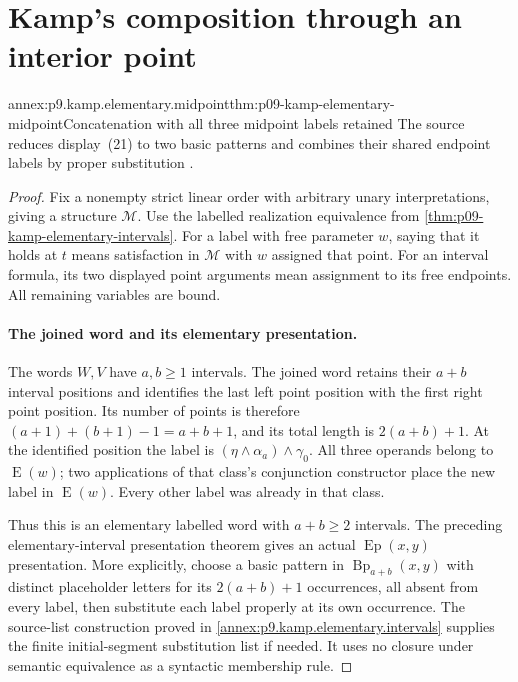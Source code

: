 
\section{Kamp's composition through an interior point}
\label{sec:annex-p09-kamp-iii2-lemma5}

\begin{annexitem}{annex:p9.kamp.elementary.midpoint}{thm:p09-kamp-elementary-midpoint}{Concatenation with all three midpoint labels retained}
The source reduces display~(21) to two basic patterns and combines their
shared endpoint labels by proper substitution
\cite[ch.~III, p.~79]{Kamp1968}.

\begin{proof}
Fix a nonempty strict linear order with arbitrary unary interpretations,
giving a structure \(\mathcal M\). Use the labelled realization
equivalence from \cref{thm:p09-kamp-elementary-intervals}.
For a label with free parameter \(w\), saying that it holds at \(t\)
means satisfaction in \(\mathcal M\) with \(w\) assigned that point.
For an interval formula, its two displayed point arguments mean
assignment to its free endpoints. All remaining variables are bound.

\paragraph{The joined word and its elementary presentation.}
The words \(W,V\) have \(a,b\geq1\) intervals. The joined word
retains their \(a+b\) interval positions and identifies the last left
point position with the first right point position. Its number of
points is therefore \((a+1)+(b+1)-1=a+b+1\), and its total length
is \(2(a+b)+1\). At the identified position the label is
\((\eta\land\alpha_a)\land\gamma_0\). All three operands belong to
\(\operatorname{E}(w)\); two applications of that class's conjunction
constructor place the new label in \(\operatorname{E}(w)\).
Every other label was already in that class.

Thus this is an elementary labelled word with \(a+b\geq2\)
intervals. The preceding elementary-interval presentation theorem gives
an actual \(\operatorname{Ep}(x,y)\) presentation. More explicitly,
choose a basic pattern in \(\operatorname{Bp}_{a+b}(x,y)\) with
distinct placeholder letters for its \(2(a+b)+1\) occurrences,
all absent from every label, then substitute each label properly at
its own occurrence. The source-list construction proved in
\cref{annex:p9.kamp.elementary.intervals} supplies the finite
initial-segment substitution list if needed. It uses no closure under
semantic equivalence as a syntactic membership rule.


\end{proof}
\end{annexitem}
